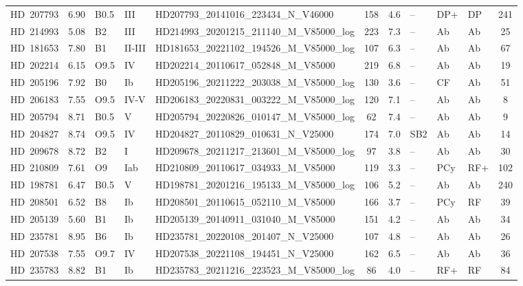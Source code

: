 {\begin{landscape}
\begin{longtable}{lclllcclllc}
\noalign{\smallskip}
HD~207793 & 6.90 & B0.5 & III & HD207793\_20141016\_223434\_N\_V46000 & 158 & 4.6 & -- & DP+ & DP & 241 \\
\noalign{\smallskip}
HD~214993 & 5.08 & B2 & III & HD214993\_20201215\_211140\_M\_V85000\_log & 223 & 7.3 & -- & Ab & Ab & 25 \\
\noalign{\smallskip}
HD~181653 & 7.80 & B1 & II-III & HD181653\_20221102\_194526\_M\_V85000\_log & 107 & 6.3 & -- & Ab & Ab & 67 \\
\noalign{\smallskip}
HD~202214 & 6.15 & O9.5 & IV & HD202214\_20110617\_052848\_M\_V85000 & 219 & 6.8 & -- & Ab & Ab & 19 \\
\noalign{\smallskip}
HD~205196 & 7.92 & B0 & Ib & HD205196\_20211222\_203038\_M\_V85000\_log & 130 & 3.6 & -- & CF & Ab & 51 \\
\noalign{\smallskip}
HD~206183 & 7.55 & O9.5 & IV-V & HD206183\_20220831\_003222\_M\_V85000\_log & 120 & 7.1 & -- & Ab & Ab & 8 \\
\noalign{\smallskip}
HD~205794 & 8.71 & B0.5 & V & HD205794\_20220826\_010147\_M\_V85000\_log & 62 & 7.4 & -- & Ab & Ab & 9 \\
\noalign{\smallskip}
HD~204827 & 8.74 & O9.5 & IV & HD204827\_20110829\_010631\_N\_V25000 & 174 & 7.0 & SB2 & Ab & Ab & 14 \\
\noalign{\smallskip}
HD~209678 & 8.72 & B2 & I & HD209678\_20211217\_213601\_M\_V85000\_log & 97 & 3.8 & -- & Ab & Ab & 30 \\
\noalign{\smallskip}
HD~210809 & 7.61 & O9 & Iab & HD210809\_20110617\_034933\_M\_V85000 & 119 & 3.3 & -- & PCy & RF+ & 102 \\
\noalign{\smallskip}
HD~198781 & 6.47 & B0.5 & V & HD198781\_20201216\_195133\_M\_V85000\_log & 106 & 5.2 & -- & Ab & Ab & 240 \\
\noalign{\smallskip}
HD~208501 & 6.52 & B8 & Ib & HD208501\_20110615\_052110\_M\_V85000 & 166 & 3.7 & -- & PCy & RF & 39 \\
\noalign{\smallskip}
HD~205139 & 5.60 & B1 & Ib & HD205139\_20140911\_031040\_M\_V85000 & 151 & 4.2 & -- & Ab & Ab & 34 \\
\noalign{\smallskip}
HD~235781 & 8.95 & B6 & Ib & HD235781\_20220108\_201407\_N\_V25000 & 107 & 4.8 & -- & Ab & Ab & 26 \\
\noalign{\smallskip}
HD~207538 & 7.55 & O9.7 & IV & HD207538\_20221108\_194451\_N\_V25000 & 162 & 6.5 & -- & Ab & Ab & 36 \\
\noalign{\smallskip}
HD~235783 & 8.82 & B1 & Ib & HD235783\_20211216\_223523\_M\_V85000\_log & 86 & 4.0 & -- & RF+ & RF & 84 \\

\end{longtable}
\end{landscape}}
